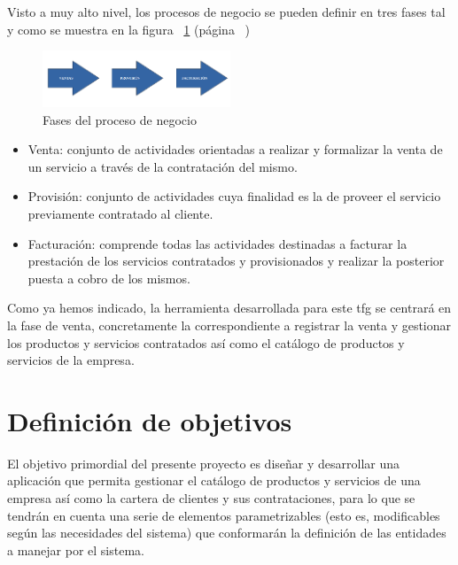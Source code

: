 Visto a muy alto nivel, los procesos de negocio se pueden definir en tres fases tal y como se muestra en la figura ~\ref{fig:fases-proceso-negocio} (página ~\pageref{fig:fases-proceso-negocio}) 


\begin{figure}[hp!]
  \centering
  \includegraphics[width=0.50\textwidth]{imaxes/fases-proceso-negocio.png}
  \caption{Fases del proceso de negocio}
  \label{fig:fases-proceso-negocio}
\end{figure}

\begin{itemize}
\item Venta: conjunto de actividades orientadas a realizar y formalizar la venta de un servicio a través de la contratación del mismo.
\item Provisión: conjunto de actividades cuya finalidad es la de proveer el servicio previamente contratado al cliente.
\item Facturación: comprende todas las actividades destinadas a facturar la prestación de los servicios contratados y provisionados y realizar la posterior puesta a cobro de los mismos.
\end{itemize}

Como ya hemos indicado, la herramienta desarrollada para este \acrlong{tfg} se centrará en la fase de venta, concretamente la correspondiente a registrar la venta y gestionar los productos y servicios contratados así como el catálogo de productos y servicios de la empresa.


\section{Definición de objetivos}
\label{sec:objetivos}


El objetivo primordial del presente proyecto es diseñar y desarrollar una aplicación que permita gestionar el catálogo de productos y servicios de una empresa así como la cartera de clientes y sus contrataciones, para lo que se tendrán en cuenta una serie de elementos parametrizables (esto es, modificables según las necesidades del sistema) que conformarán la definición de las entidades a manejar por el sistema.

